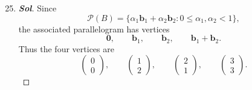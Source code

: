 \begin{enumerate}
\begin{center}
	\end{center}
\end{enumerate}

\begin{enumerate}
	\setcounter{enumi}{24}
	\item \begin{proof}[\normalfont\color{magenta}\bfseries Sol]
			Since
			\[
			\mathcal P(B)=\{\alpha_1\mathbf b_1+\alpha_2\mathbf b_2:0\le \alpha_1,\alpha_2<1\},
			\]
			the associated parallelogram has vertices
			\[
			\mathbf 0,\qquad \mathbf b_1,\qquad \mathbf b_2,\qquad \mathbf b_1+\mathbf b_2.
			\]
			Thus the four vertices are
			\[
			\boxed{
					\begin{pmatrix}
							0\\
							0
						\end{pmatrix},
					\qquad
					\begin{pmatrix}
							1\\
							2
						\end{pmatrix},
					\qquad
					\begin{pmatrix}
							2\\
							1
						\end{pmatrix},
					\qquad
					\begin{pmatrix}
							3\\
							3
						\end{pmatrix}.
				}
			\]
			\medskip
			

\end{proof}
\end{enumerate}
